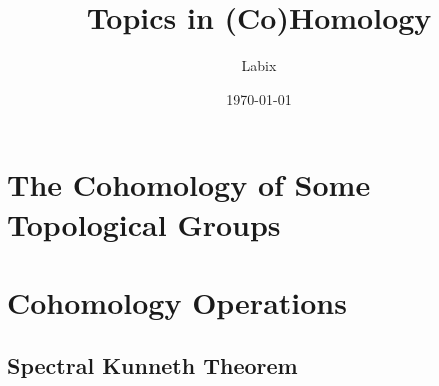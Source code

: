 \documentclass[a4paper]{article}
\title{Topics in (Co)Homology}
\author{Labix}
\date{\today}
\begin{document}
\maketitle
\begin{abstract}
\end{abstract}
\pagebreak
\tableofcontents

\pagebreak
\pagebreak
\section{The Cohomology of Some Topological Groups}

\pagebreak
\section{Cohomology Operations}

\pagebreak
\subsection{Spectral Kunneth Theorem}
\end{document}
